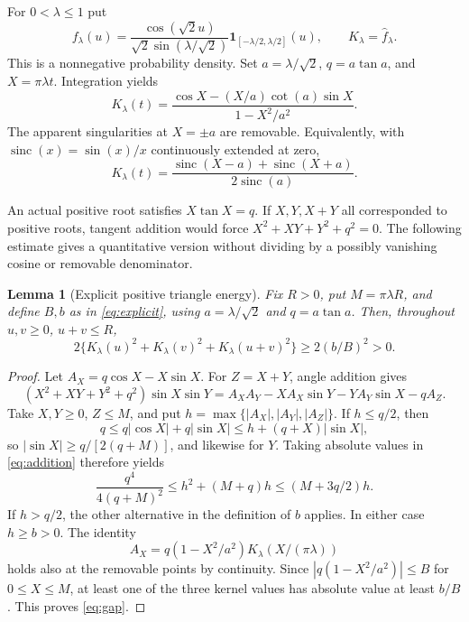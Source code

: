 \documentclass[11pt]{article}
\newtheorem{lemma}[theorem]{Lemma}
\theoremstyle{remark}
\begin{document}
For $0<\lambda\le1$ put
\begin{equation}\label{eq:density}
 f_\lambda(u)=\frac{\cos(\sqrt2u)}{\sqrt2\sin(\lambda/\sqrt2)}
       \mathbf1_{[-\lambda/2,\lambda/2]}(u),\qquad
 K_\lambda=\widehat f_\lambda.
\end{equation}
This is a nonnegative probability density. Set $a=\lambda/\sqrt2$,
$q=a\tan a$, and $X=\pi\lambda t$. Integration yields
\begin{equation}\label{eq:kernel}
 K_\lambda(t)=
 \frac{\cos X-(X/a)\cot(a)\sin X}{1-X^2/a^2}.
\end{equation}
The apparent singularities at $X=\pm a$ are removable. Equivalently,
with $\operatorname{sinc}(x)=\sin(x)/x$ continuously extended at zero,
\begin{equation}\label{eq:sinc}
 K_\lambda(t)=
 \frac{\operatorname{sinc}(X-a)+\operatorname{sinc}(X+a)}
      {2\operatorname{sinc}(a)}.
\end{equation}

An actual positive root satisfies $X\tan X=q$. If $X,Y,X+Y$ all
corresponded to positive roots, tangent addition would force
$X^2+XY+Y^2+q^2=0$. The following estimate gives a quantitative version
without dividing by a possibly vanishing cosine or removable denominator.

\begin{lemma}[Explicit positive triangle energy]\label{lem:gap}
Fix $R>0$, put $M=\pi\lambda R$, and define $B,b$ as in
\eqref{eq:explicit}, using $a=\lambda/\sqrt2$ and $q=a\tan a$.
Then, throughout $u,v\ge0$, $u+v\le R$,
\begin{equation}\label{eq:gap}
 2\{K_\lambda(u)^2+K_\lambda(v)^2+K_\lambda(u+v)^2\}
 \ge2(b/B)^2>0.
\end{equation}
\end{lemma}
\begin{proof}
Let $A_X=q\cos X-X\sin X$. For $Z=X+Y$, angle addition gives
\begin{equation}\label{eq:addition}
 (X^2+XY+Y^2+q^2)\sin X\sin Y
 =A_XA_Y-XA_X\sin Y-YA_Y\sin X-qA_Z.
\end{equation}
Take $X,Y\ge0$, $Z\le M$, and put
$h=\max\{|A_X|,|A_Y|,|A_Z|\}$. If $h\le q/2$, then
\[
 q\le q|\cos X|+q|\sin X|
 \le h+(q+X)|\sin X|,
\]
so $|\sin X|\ge q/[2(q+M)]$, and likewise for $Y$. Taking absolute
values in \eqref{eq:addition} therefore yields
\[
 \frac{q^4}{4(q+M)^2}\le h^2+(M+q)h
 \le(M+3q/2)h.
\]
If $h>q/2$, the other alternative in the definition of $b$ applies.
In either case $h\ge b>0$. The identity
\[
 A_X=q(1-X^2/a^2)K_\lambda(X/(\pi\lambda))
\]
holds also at the removable points by continuity. Since
$|q(1-X^2/a^2)|\le B$ for $0\le X\le M$, at least one of the three
kernel values has absolute value at least $b/B$. This proves
\eqref{eq:gap}.
\end{proof}
\end{document}
